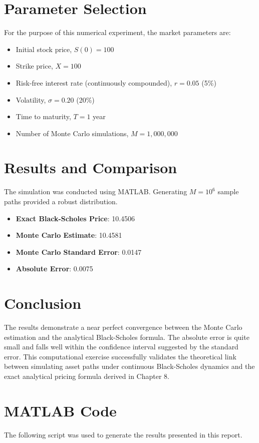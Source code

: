 \documentclass{article}
\begin{document}
\section{Parameter Selection}
For the purpose of this numerical experiment, the market parameters are:
\begin{itemize}
    \item Initial stock price, $S(0) = 100$
    \item Strike price, $X = 100$
    \item Risk-free interest rate (continuously compounded), $r = 0.05$ (5\%)
    \item Volatility, $\sigma = 0.20$ (20\%)
    \item Time to maturity, $T = 1$ year
    \item Number of Monte Carlo simulations, $M = 1,000,000$
\end{itemize}

\section{Results and Comparison}
The simulation was conducted using MATLAB. Generating $M = 10^6$ sample paths provided a robust distribution.

\begin{itemize}
    \item \textbf{Exact Black-Scholes Price}: 10.4506
    \item \textbf{Monte Carlo Estimate}: 10.4581
    \item \textbf{Monte Carlo Standard Error}: 0.0147
    \item \textbf{Absolute Error}: 0.0075
\end{itemize}

\section{Conclusion}
The results demonstrate a near perfect convergence between the Monte Carlo estimation and the analytical Black-Scholes formula. The absolute error is quite small and falls well within the confidence interval suggested by the standard error. This computational exercise successfully validates the theoretical link between simulating asset paths under continuous Black-Scholes dynamics and the exact analytical pricing formula derived in Chapter 8.

\newpage
\section{MATLAB Code}
The following script was used to generate the results presented in this report.
\end{document}
